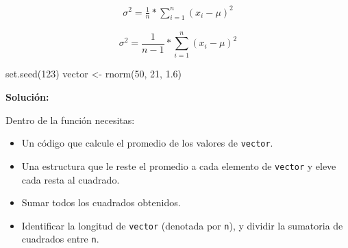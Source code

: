 \documentclass[
]{article}
\newenvironment{Shaded}{\begin{snugshade}}{\end{snugshade}}
\newcommand{\DecValTok}[1]{\textcolor[rgb]{0.00,0.00,0.81}{#1}}
\newcommand{\FloatTok}[1]{\textcolor[rgb]{0.00,0.00,0.81}{#1}}
\newcommand{\FunctionTok}[1]{\textcolor[rgb]{0.00,0.00,0.00}{#1}}
\newcommand{\NormalTok}[1]{#1}
\newcommand{\OtherTok}[1]{\textcolor[rgb]{0.56,0.35,0.01}{#1}}
\providecommand{\tightlist}{%
  \setlength{\itemsep}{0pt}\setlength{\parskip}{0pt}}
\theoremstyle{definition}
\theoremstyle{definition}
\theoremstyle{definition}
\theoremstyle{definition}
\theoremstyle{remark}
\begin{document}
\begin{align}
  \sigma^2 = \frac{1}{n}*{\displaystyle\sum_{i=1}^{n}(x_i - \mu)^2} \label{eq:varianzapob}
  \end{align}

\begin{equation}
  \sigma^2 = \frac{1}{n-1}*{\displaystyle\sum_{i=1}^{n}(x_i - \mu)^2} \label{eq:varianzamuestral}
  \end{equation}

\begin{Shaded}
\begin{Highlighting}[]
\FunctionTok{set.seed}\NormalTok{(}\DecValTok{123}\NormalTok{)}
\NormalTok{vector }\OtherTok{\textless{}{-}} \FunctionTok{rnorm}\NormalTok{(}\DecValTok{50}\NormalTok{, }\DecValTok{21}\NormalTok{, }\FloatTok{1.6}\NormalTok{)}
\end{Highlighting}
\end{Shaded}

\textbf{Solución:}

Dentro de la función necesitas:

\begin{itemize}
\tightlist
\item
  Un código que calcule el promedio de los valores de \texttt{vector}.
\item
  Una estructura que le reste el promedio a cada elemento de \texttt{vector} y eleve cada resta al cuadrado.
\item
  Sumar todos los cuadrados obtenidos.
\item
  Identificar la longitud de \texttt{vector} (denotada por \texttt{n}), y dividir la sumatoria de cuadrados entre \texttt{n}.
\end{itemize}
\end{document}
